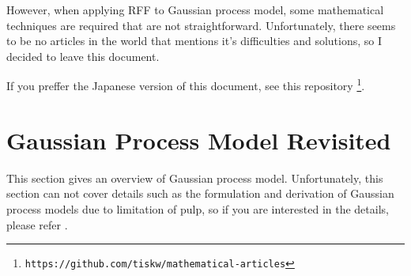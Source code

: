 \documentclass[twocolumn,a4paper,10pt]{article}
\begin{document}
However, when applying RFF to Gaussian process model, some mathematical techniques are required
that are not straightforward. Unfortunately, there seems to be no articles in the world
that mentions it's difficulties and solutions, so I decided to leave this document.

If you preffer the Japanese version of this document, see this repository
\footnote{\texttt{https://github.com/tiskw/mathematical-articles}}.


\section{Gaussian Process Model Revisited}\titlebar

This section gives an overview of Gaussian process model. Unfortunately, this section
can not cover details such as the formulation and derivation of Gaussian process models
due to limitation of pulp, so if you are interested in the details,
please refer \cite{Rasmussen2006}.
\end{document}
